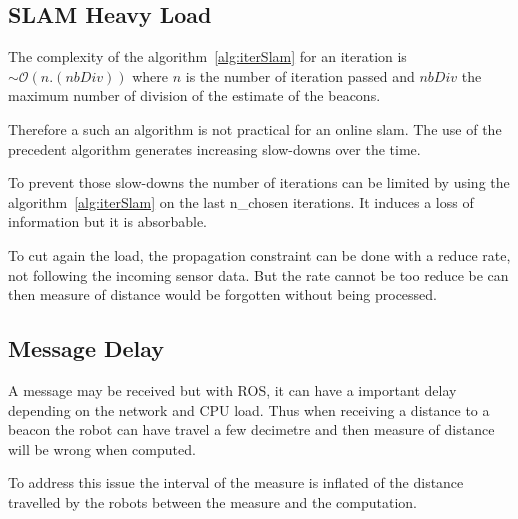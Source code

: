 \subsection{SLAM Heavy Load}

The complexity of the algorithm~\ref{alg:iterSlam} for an iteration is $\sim\mathcal{O}(n.(nbDiv))$ where $n$ is the number of iteration passed and $nbDiv$ the maximum number of division of the estimate of the beacons.

Therefore a such an algorithm is not practical for an online slam. The use of the precedent algorithm  generates increasing slow-downs over the time.

To prevent those slow-downs the number of iterations can be limited by using the algorithm~\ref{alg:iterSlam} on the last n\_chosen iterations. It induces a loss of information but it is absorbable.

To cut again the load, the propagation constraint can be done with a reduce rate, not following the incoming sensor data. But the rate cannot be too reduce be can then measure of distance would be forgotten without being processed.

\subsection{Message Delay}\label{ssec:delaycompProb}

A message may be received but with ROS, it can have a important delay depending on the network and CPU load. Thus when receiving a distance to a beacon the robot can have travel a few decimetre and then measure of distance will be wrong when computed.

To address this issue the interval of the measure is inflated of the distance travelled by the robots between the measure and the computation. 